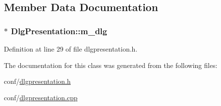 \subsection{Member Data Documentation}
\hypertarget{classDlgPresentation_a010a8c09c59fa2c78efd78b983e9c569}{
\subsubsection[{m\+\_\+dlg}]{$\ast$ Dlg\+Presentation\+::m\+\_\+dlg\hspace{0.3cm}{\ttfamily [protected]}}}\label{classDlgPresentation_a010a8c09c59fa2c78efd78b983e9c569}


Definition at line 29 of file dlgpresentation.\+h.



The documentation for this class was generated from the following files\+:\begin{DoxyCompactItemize}
\item 
conf/\hyperlink{dlgpresentation_8h}{dlgpresentation.\+h}\item 
conf/\hyperlink{dlgpresentation_8cpp}{dlgpresentation.\+cpp}\end{DoxyCompactItemize}
